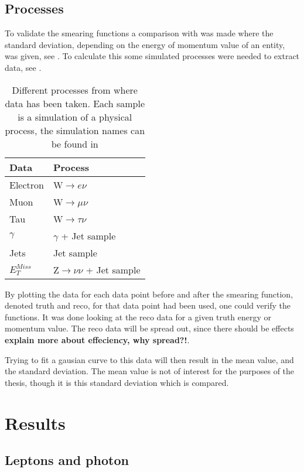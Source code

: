 \subsection{Processes}
To validate the smearing functions a comparison with \citep{ATL-PHYS-PUB-2013-004} was made where the standard deviation, depending on the energy of momentum value of an entity, was given, see . To calculate this some simulated processes were needed to extract data, see . 
\begin{SCtable}[][ht]
\begin{tabular}{|l|l|}
\hline
Data & Process \\ \hline
Electron & W$\rightarrow e\nu$ \\
Muon & W$\rightarrow \mu \nu$ \\
Tau & W$\rightarrow \tau \nu$ \\
$\gamma$ & $\gamma$ + Jet sample \\
Jets & Jet sample \\
$E_T^{Miss}$ & Z$\rightarrow \nu \nu$ + Jet sample \\ \hline
\end{tabular}
\caption{Different processes from where data has been taken. Each sample is a simulation of a physical process, the simulation names can be found in }
\label{tab:backproc}
\end{SCtable}

By plotting the data for each data point before and after the smearing function, denoted truth and reco, for that data point had been used, one could verify the functions. It was done looking at the reco data for a given truth energy or momentum value. The reco data will be spread out, since there should be effects \textbf{explain more about effeciency, why spread?!}. 

Trying to fit a gausian curve to this data will then result in the mean value, and the standard deviation. The mean value is not of interest for the purposes of the thesis, though it is this standard deviation which is compared. 


\section{Results}\label{cha:vali:sec:results}
\subsection{Leptons and photon}
